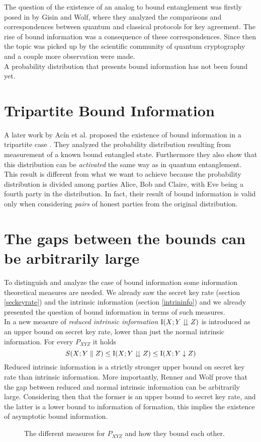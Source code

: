 The question of the existence of an analog to bound entanglement was firstly posed in \cite{GisWolf00} by Gisin and Wolf, where they analyzed the comparisons and correspondences between quantum and classical protocols for key agreement. 
The rise of bound information was a consequence of these correspondences.
Since then the topic was picked up by the scientific community of quantum cryptography and a couple more observation were made.\\
A probability distribution that presents bound information has not been found yet.

\section{Tripartite Bound Information}
    A later work by Ac\'in et al. proposed the existence of bound information in a tripartite case \cite{ACM04}. 
    They analyzed the probability distribution resulting from measurement of a known bound entangled state. 
    Furthermore they also show that this distribution can be \textit{activated} the same way as in quantum entanglement.\\
    This result is different from what we want to achieve because the probability distribution is divided among parties Alice, Bob and Claire, with Eve being a fourth party in the distribution. 
    In fact, their result of bound information is valid only when considering \emph{pairs} of honest parties from the original distribution.
\section{The gaps between the bounds can be arbitrarily large}
    To distinguish and analyze the case of bound information some information theoretical measures are needed. 
    We already saw the secret key rate (section \ref{seckeyrate}) and the intrinsic information (section \ref{intrininfo}) and we already presented the question of bound information in terms of such measures. \\
    In \cite{RW03} a new measure of \emph{reduced intrinsic information} $\operatorname{I}(X;Y\downdownarrows Z)$ is introduced as an upper bound on secret key rate, lower than just the normal intrinsic information.
    For every $P_{XYZ}$ it holds
    \begin{equation} \label{eq:bounds}
    	S(X;Y\parallel Z) \leq \operatorname{I}(X;Y\downdownarrows Z) \leq \operatorname{I}(X;Y\downarrow Z)
    \end{equation}
    	Reduced intrinsic information is a strictly stronger upper bound on secret key rate than intrinsic information.
    	More importantly, Renner and Wolf prove that the gap between reduced and normal intrinsic information can be arbitrarily large. 
    	Considering then that the former is an upper bound to secret key rate, and the latter is a lower bound to information of formation, this implies the existence of asymptotic bound information.
    	\begin{figure}
    		
    		\caption{The different measures for $P_{XYZ}$ and how they bound each other.}
    	\end{figure}
    	
